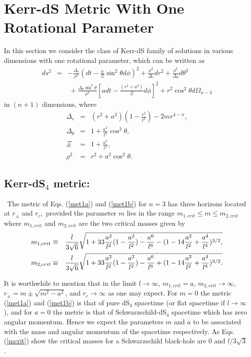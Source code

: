 \documentclass[a4paper,12pt,onecolumn]{revtex4}
\begin{document}
\section{Kerr-dS Metric With One Rotational Parameter\label{Kerr}}

In this section we consider the class of Kerr-dS family of solutions in
various dimensions with one rotational parameter, which can be written as
\begin{eqnarray}
ds^2 &=&-\frac{\Delta _r}{\rho ^2}(dt-\frac a\Xi \sin ^2\theta d\phi )^2+%
\frac{\rho ^2}{\Delta _r}dr^2+\frac{\rho ^2}{\Delta _\theta }d\theta ^2
\nonumber \\
&&\ +\frac{\Delta _\theta \sin ^2\theta }{\rho ^2}[adt-\frac{(r^2+a^2)}\Xi
d\phi ]^2+r^2\cos ^2\theta d\Omega _{n-3}  \label{met1a}
\end{eqnarray}
in $(n+1)$ dimensions, where
\begin{eqnarray}
\Delta _r &=&(r^2+a^2)(1-\frac{r^2}{l^2})-2mr^{4-n},  \nonumber \\
\Delta _\theta  &=&1+\frac{a^2}{l^2}\cos ^2\theta ,  \nonumber \\
\Xi  &=&1+\frac{a^2}{l^2},  \nonumber \\
\rho ^2 &=&r^2+a^2\cos ^2\theta .  \label{met1b}
\end{eqnarray}

\subsection{Kerr-dS$_4$ metric:}

\ The metric of Eqs. (\ref{met1a}) and (\ref{met1b}) for $n=3$ has
three horizons located at $r_{\pm }$ and $r_c$,\ provided the
parameter $m$ lies in the range $m_{1,crit}\leq m\leq m_{2,crit}$
where $m_{1,crit}$ and $m_{2,crit}$ are the two critical masses
given by
\begin{eqnarray}
m_{1,crit} &\equiv &\frac l{3\sqrt{6}}\sqrt{1+33\frac{a^2}{l^2}(1-\frac{a^2}{%
l^2})-\frac{a^6}{l^6}-(1-14\frac{a^2}{l^2}+\frac{a^4}{l^4})^{3/2},}
\nonumber \\
m_{2,crit} &\equiv &\frac l{3\sqrt{6}}\sqrt{1+33\frac{a^2}{l^2}(1-\frac{a^2}{%
l^2})-\frac{a^6}{l^6}+(1-14\frac{a^2}{l^2}+\frac{a^4}{l^4})^{3/2}.}
\label{mcrit}
\end{eqnarray}

It is worthwhile to mention that in the limit $l\rightarrow \infty $, $%
m_{1,crit}=a$, $m_{2,crit}\rightarrow \infty $, $r_{\pm }=m\pm
\sqrt{m^2-a^2} $, and $r_c\rightarrow \infty $ as one may expect.
For $m=0$ the metric (\ref {met1a}) and (\ref{met1b}) is that of
pure dS$_4$ spacetime (or flat spacetime if $l\rightarrow \infty
$), and for $a=0$ the metric is that of Schwarzschild-dS$_4$
spacetime which has zero angular momentum. Hence we expect the
parameters $m$ and $a$ to be associated with the mass and angular
momentum of the spacetime respectively. As Eqs. (\ref{mcrit}) show
the critical masses for a Schwarzschild black-hole are $0$ and
$l/3\sqrt{3}$ \cite{Kl1}.
\end{document}
